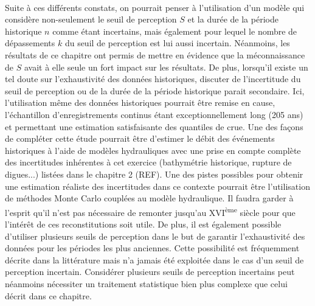 \documentclass[11pt]{article}
\begin{document}
	\paragraph{} Suite à ces différents constats, on pourrait penser à l'utilisation d'un modèle qui considère non-seulement le seuil de perception $S$ et la durée de la période historique $n$ comme étant incertains, mais également pour lequel le nombre de dépassements $k$ du seuil de perception est lui aussi incertain. Néanmoins, les résultats de ce chapitre ont permis de mettre en évidence que la méconnaissance de $S$ avait à elle seule un fort impact sur les résultats. De plus, lorsqu'il existe un tel doute sur l'exhaustivité des données historiques, discuter de l'incertitude du seuil de perception ou de la durée de la période historique parait secondaire. Ici, l'utilisation même des données historiques pourrait être remise en cause, l'échantillon d'enregistrements continus étant exceptionnellement long (205 ans) et permettant une estimation satisfaisante des quantiles de crue. Une des façons de compléter cette étude pourrait être d'estimer le débit des événements historiques à l'aide de modèles hydrauliques avec une prise en compte complète des incertitudes inhérentes à cet exercice (bathymétrie historique, rupture de digues...) listées dans le chapitre 2 (REF). Une des pistes possibles pour obtenir une estimation réaliste des incertitudes dans ce contexte pourrait être l'utilisation de méthodes Monte Carlo couplées au modèle hydraulique. Il faudra garder à l'esprit qu'il n'est pas nécessaire de remonter jusqu'au XVI\textsuperscript{ème} siècle pour que l'intérêt de ces reconstitutions soit utile. De plus, il est également possible d'utiliser plusieurs seuils de perception dans le but de garantir l'exhaustivité des données pour les périodes les plus anciennes. Cette possibilité est fréquemment décrite dans la littérature mais n'a jamais été exploitée dans le cas d'un seuil de perception incertain. Considérer plusieurs seuils de perception incertains peut néanmoins nécessiter un traitement statistique bien plus complexe que celui décrit dans ce chapitre.
	
\end{document}
